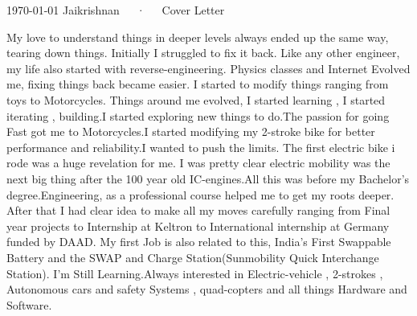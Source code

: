 \documentclass[11pt, a4paper]{awesome-cv}
\begin{document}
\makecvheader[R]

\makecvfooter
  {\today}
  {Jaikrishnan~~~·~~~Cover Letter}
  {}

\makelettertitle

\begin{cvletter}

My love to understand things in deeper levels always ended up the same way, tearing down things. Initially I struggled to fix it back. Like any other engineer, my life also started with reverse-engineering. Physics classes and Internet Evolved me, fixing things back became easier. I started to modify things ranging from toys to Motorcycles. Things around me evolved, I started learning , I started iterating , building.I started exploring new things to do.The passion for going Fast got me to Motorcycles.I started modifying my 2-stroke bike for better performance and reliability.I wanted to push the limits. The first electric bike i rode was a huge revelation for me. I was pretty clear electric mobility was the next big thing after the 100 year old IC-engines.All this was before my Bachelor’s degree.Engineering, as a professional course helped me to get my roots deeper. After that I had clear idea to make all my moves carefully ranging from Final year projects to Internship at Keltron to International internship at Germany funded by DAAD. My first Job is also related to this, India's First Swappable Battery and the SWAP and Charge Station(Sunmobility Quick Interchange Station). I'm Still Learning.Always interested in Electric-vehicle , 2-strokes , Autonomous cars and safety Systems , quad-copters and all things Hardware and Software.


\end{cvletter}


\makeletterclosing
\end{document}
